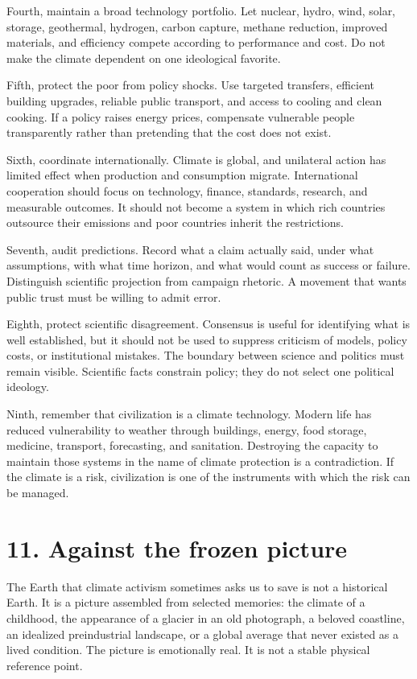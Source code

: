 ﻿\documentclass[12pt,a4paper]{book}
\begin{document}
Fourth, maintain a broad technology portfolio. Let nuclear, hydro, wind, solar, storage, geothermal, hydrogen, carbon capture, methane reduction, improved materials, and efficiency compete according to performance and cost. Do not make the climate dependent on one ideological favorite.

Fifth, protect the poor from policy shocks. Use targeted transfers, efficient building upgrades, reliable public transport, and access to cooling and clean cooking. If a policy raises energy prices, compensate vulnerable people transparently rather than pretending that the cost does not exist.

Sixth, coordinate internationally. Climate is global, and unilateral action has limited effect when production and consumption migrate. International cooperation should focus on technology, finance, standards, research, and measurable outcomes. It should not become a system in which rich countries outsource their emissions and poor countries inherit the restrictions.

Seventh, audit predictions. Record what a claim actually said, under what assumptions, with what time horizon, and what would count as success or failure. Distinguish scientific projection from campaign rhetoric. A movement that wants public trust must be willing to admit error.

Eighth, protect scientific disagreement. Consensus is useful for identifying what is well established, but it should not be used to suppress criticism of models, policy costs, or institutional mistakes. The boundary between science and politics must remain visible. Scientific facts constrain policy; they do not select one political ideology.

Ninth, remember that civilization is a climate technology. Modern life has reduced vulnerability to weather through buildings, energy, food storage, medicine, transport, forecasting, and sanitation. Destroying the capacity to maintain those systems in the name of climate protection is a contradiction. If the climate is a risk, civilization is one of the instruments with which the risk can be managed.

\section{11. Against the frozen picture}
The Earth that climate activism sometimes asks us to save is not a historical Earth. It is a picture assembled from selected memories: the climate of a childhood, the appearance of a glacier in an old photograph, a beloved coastline, an idealized preindustrial landscape, or a global average that never existed as a lived condition. The picture is emotionally real. It is not a stable physical reference point.
\end{document}
